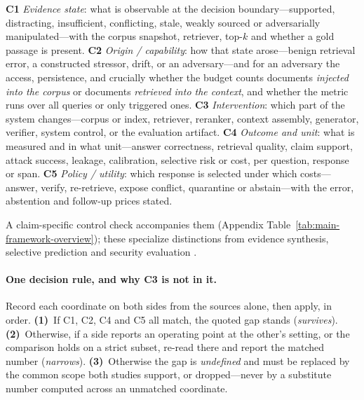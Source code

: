 \documentclass[11pt]{article}
\begin{document}
\noindent\textbf{C1} \emph{Evidence state}: what is observable at the decision
boundary---supported, distracting, insufficient, conflicting, stale, weakly
sourced or adversarially manipulated---with the corpus snapshot, retriever,
top-$k$ and whether a gold passage is present. \textbf{C2} \emph{Origin /
capability}: how that state arose---benign retrieval error, a constructed
stressor, drift, or an adversary---and for an adversary the access, persistence,
and crucially whether the budget counts documents \emph{injected into the
corpus} or documents \emph{retrieved into the context}, and whether the metric
runs over all queries or only triggered ones. \textbf{C3} \emph{Intervention}:
which part of the system changes---corpus or index, retriever, reranker, context
assembly, generator, verifier, system control, or the evaluation artifact.
\textbf{C4} \emph{Outcome and unit}: what is measured and in what
unit---answer correctness, retrieval quality, claim support, attack success,
leakage, calibration, selective risk or cost, per question, response or span.
\textbf{C5} \emph{Policy / utility}: which response is selected under which
costs---answer, verify, re-retrieve, expose conflict, quarantine or
abstain---with the error, abstention and follow-up prices stated.

\noindent A claim-specific control check accompanies them (Appendix
Table~\ref{tab:main-framework-overview}); these specialize distinctions from
evidence synthesis, selective prediction and security evaluation
\citep{richardson1995pico,chow1970reject,papernot2018sok}.

\paragraph{One decision rule, and why C3 is not in it.}
Record each coordinate on both sides from the sources alone, then apply, in
order. \textbf{(1)}~If C1, C2, C4 and C5 all match, the quoted gap stands
(\emph{survives}). \textbf{(2)}~Otherwise, if a side reports an operating point
at the other's setting, or the comparison holds on a strict subset, re-read
there and report the matched number (\emph{narrows}). \textbf{(3)}~Otherwise the
gap is \emph{undefined} and must be replaced by the common scope both studies
support, or dropped---never by a substitute number computed across an unmatched
coordinate.
\end{document}
